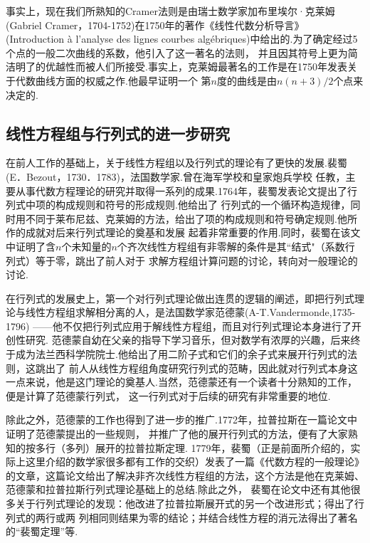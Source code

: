 事实上，现在我们所熟知的Cramer法则是由瑞士数学家加布里埃尔·克莱姆(Gabriel Cramer，1704-1752)在1750年的著作《线性代数分析导言》
(Introduction à l'analyse des lignes courbes algébriques)中给出的.为了确定经过5个点的一般二次曲线的系数，他引入了这一著名的法则，
并且因其符号上更为简洁明了的优越性而被人们所接受.事实上，克莱姆最著名的工作是在1750年发表关于代数曲线方面的权威之作.他最早证明一个
第$n$度的曲线是由$n(n + 3)/2$个点来决定的.

\subsection{线性方程组与行列式的进一步研究}
在前人工作的基础上，关于线性方程组以及行列式的理论有了更快的发展.裴蜀(E．Bezout，1730．1783)，法国数学家.曾在海军学校和皇家炮兵学校
任教，主要从事代数方程理论的研究并取得一系列的成果.1764年，裴蜀发表论文提出了行列式中项的构成规则和符号的形成规则.他给出了
行列式的一个循环构造规律，同时用不同于莱布尼兹、克莱姆的方法，给出了项的构成规则和符号确定规则.他所作的成就对后来行列式理论的奠基和发展
起着非常重要的作用.同时，裴蜀在该文中证明了含$n$个未知量的$n$个齐次线性方程组有非零解的条件是其“结式"（系数行列式）等于零，跳出了前人对于
求解方程组计算问题的讨论，转向对一般理论的讨论.

在行列式的发展史上，第一个对行列式理论做出连贯的逻辑的阐述，即把行列式理论与线性方程组求解相分离的人，是法国数学家范德蒙(A-T.Vandermonde,1735-1796)
——他不仅把行列式应用于解线性方程组，而且对行列式理论本身进行了开创性研究.
范德蒙自幼在父亲的指导下学习音乐，但对数学有浓厚的兴趣，后来终于成为法兰西科学院院士.他给出了用二阶子式和它们的余子式来展开行列式的法则，这跳出了
前人从线性方程组角度研究行列式的范畴，因此就对行列式本身这一点来说，他是这门理论的奠基人.当然，范德蒙还有一个读者十分熟知的工作，便是计算了范德蒙行列式，
这一行列式对于后续的研究有非常重要的地位.

除此之外，范德蒙的工作也得到了进一步的推广.1772年，拉普拉斯在一篇论文中证明了范德蒙提出的一些规则，
并推广了他的展开行列式的方法，便有了大家熟知的按多行（多列）展开的拉普拉斯定理.
1779年，裴蜀（正是前面所介绍的，实际上这里介绍的数学家很多都有工作的交织）发表了一篇《代数方程的一般理论》
的文章，这篇论文给出了解决非齐次线性方程组的方法，这个方法是他在克莱姆、范德蒙和拉普拉斯行列式理论基础上的总结.除此之外，
裴蜀在论文中还有其他很多关于行列式理论的发现：他改进了拉普拉斯展开式的另一个改进形式；得出了行列式的两行或两
列相同则结果为零的结论；并结合线性方程的消元法得出了著名的``裴蜀定理''等.

